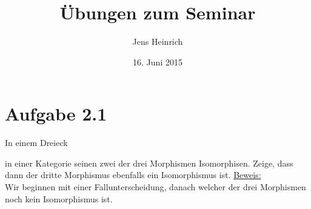 \documentclass{article}
\title{\"Ubungen zum Seminar \boldfont{Kategorientheorie} }
\author{Jens Heinrich}
\date{16. Juni 2015}
\begin{document}
 

\section*{Aufgabe 2.1}
	In einem Dreieck 

	
	in einer Kategorie seinen zwei der drei Morphismen Isomorphisen.
	Zeige, dass dann der dritte Morphismus ebenfalls ein Isomorphismus ist.
	\underline{Beweis:} \\
		Wir beginnen mit einer Fallunterscheidung, danach welcher der drei Morphismen noch kein Isomorphismus ist.
		
\end{document}
